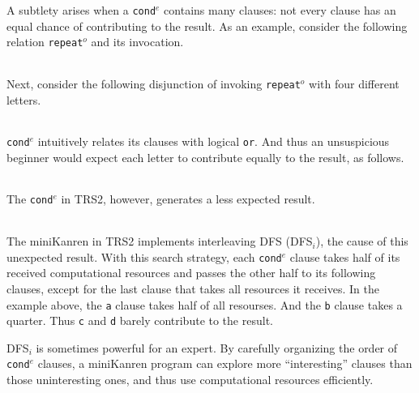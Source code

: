 \documentclass[format=acmlarge, review=true, authordraft=true]{acmart}
\newcommand{\conde}{\texttt{cond$^e$}}
\newcommand{\clisting}[1]{
\begin{center}
  \begin{tabular}{c}
	
    \end{tabular}
\end{center}
}
\newcommand{\repeato}{\texttt{repeat$^o$}}
\newcommand{\DFSi }[0]{DFS$_{i}$}
\begin{document}

A subtlety arises 
when a \conde{} contains many clauses: not every clause has an 
equal chance of contributing to the result. As an example, consider the following 
relation \repeato{} and its invocation. 

\clisting{Figures/repeato.rkt}

Next, consider the following disjunction of invoking \repeato{} with four 
different letters.

\clisting{Figures/example.rkt}

\conde{} intuitively relates its clauses with logical \texttt{or}. And thus an 
unsuspicious beginner would expect each letter to contribute equally to the 
result, as follows.

\clisting{Figures/run-repeato-fair.rkt}

The \conde{} in TRS2, however, generates a less expected result.

\clisting{Figures/run-repeato-idfs.rkt}

The miniKanren in TRS2 implements interleaving DFS (\DFSi), the cause of this 
unexpected result. With this search strategy, each \conde{} clause takes half 
of its received computational resources and passes the other half to its 
following clauses, except for the last clause that takes all resources it 
receives. In the example above, the \texttt{a} clause takes half of all 
resourses. And the \texttt{b} clause takes a quarter. Thus \texttt{c} and 
\texttt{d} barely contribute to the result.


\DFSi{} is sometimes powerful for an expert. By carefully organizing the order 
of \conde{} clauses, a miniKanren program can explore more ``interesting'' 
clauses than those uninteresting ones, and thus use computational resources 
efficiently.

\end{document}

